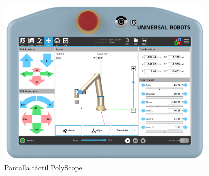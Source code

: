 \begin{figure} [h!]
  \begin{center}
    \includegraphics[width=10.5cm]{figs/PolyScope}
  \end{center}
  \caption{\centering Pantalla táctil PolyScope. \cite{PloyScope_img}}
  \label{fig:PolyScope}
\end{figure} 


